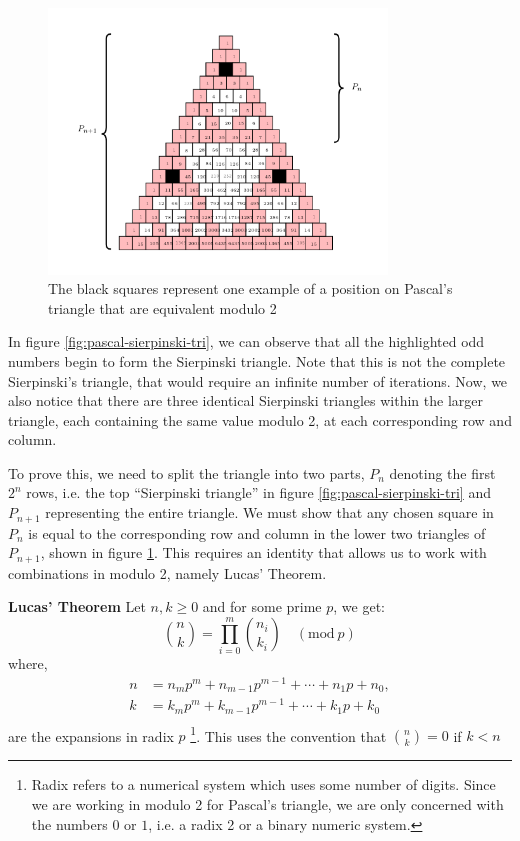 \documentclass[a4paper,11pt,twoside]{article}
\begin{document}
\begin{figure}[htbp]
\centering
\includegraphics[width=9cm]{media/tikz/row-column-pascal.png}
\caption{\label{fig:row-column-pascal}The black squares represent one example of a position on Pascal's triangle that are equivalent modulo 2}
\end{figure}

In figure \ref{fig:pascal-sierpinski-tri}, we can observe that all the highlighted odd numbers begin to form the Sierpinski triangle. Note that this is not the complete Sierpinski's triangle, that would require an infinite number of iterations. Now, we also notice that there are three identical Sierpinski triangles within the larger triangle, each containing the same value modulo 2, at each corresponding row and column.

To prove this, we need to split the triangle into two parts, \(P_{n}\) denoting the first \(2^{n}\) rows, i.e. the top ``Sierpinski triangle'' in figure \ref{fig:pascal-sierpinski-tri} and \(P_{n+1}\) representing the entire triangle. We must show that any chosen square in \(P_{n}\) is equal to the corresponding row and column in the lower two triangles of \(P_{n+1}\), shown in figure \ref{fig:row-column-pascal}. This requires an identity that allows us to work with combinations in modulo 2, namely Lucas' Theorem.

\textbf{Lucas' Theorem}
Let \(n,k \ge 0\) and for some prime \(p\), we get:
\begin{equation}
\binom{n}{k} = \prod_{i=0}^{m} \binom{n_i}{k_i} \quad (\text{mod}~p)
\end{equation}
where,
\begin{align*}
n &= n_{m}p^{m}+n_{m-1}p^{m-1}+\cdots + n_{1}p+n_{0},\\
k &= k_{m}p^{m}+k_{m-1}p^{m-1}+\cdots + k_{1}p+k_{0}\\
\end{align*}
are the expansions in radix \(p\) \footnote{Radix refers to a numerical system which uses some number of digits. Since we are working in modulo 2 for Pascal's triangle, we are only concerned with the numbers \(0\) or \(1\), i.e. a radix 2 or a binary numeric system.}. This uses the convention that \(\binom{n}{k} = 0\) if \(k < n\)
\end{document}
